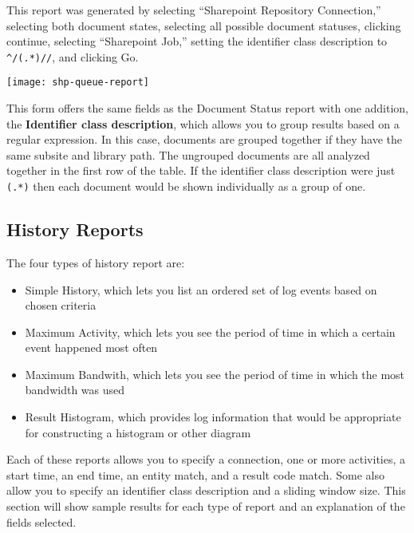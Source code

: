 \begin{changemargin}{1.5in}{0in}
This report was generated by selecting ``Sharepoint Repository
Connection,'' selecting both document states, selecting all possible
document statuses, clicking continue, selecting ``Sharepoint Job,''
setting the identifier class description to \linebreak \texttt{\^{}/(.*)//}, and
clicking Go.

\texttt{[image: shp-queue-report]}

This form offers the same fields as the Document Status report with
one addition, the \textbf{Identifier class description}, which allows
you to group results based on a regular expression. In this case,
documents are grouped together if they have the same subsite and
library path. The ungrouped documents are all analyzed together in the
first row of the table. If the identifier class description were just
\texttt{(.*)} then each document would be shown individually as a group of
one.



\subsection{History Reports}

The four types of history report are:

\begin{itemize}

\item Simple History, which lets you list an ordered set of log events
based on chosen criteria

\item Maximum Activity, which lets you see the period of time in
which a certain event happened most often

\item Maximum Bandwith, which lets you see the period of time in
which the most bandwidth was used 

\item Result Histogram, which provides log information that would be
appropriate for constructing a histogram or other diagram

\end{itemize}

Each of these reports allows you to specify a connection, one or more
activities, a start time, an end time, an entity match, and a result code
match.  Some also allow you to specify an identifier class description
and a sliding window size. This section will show sample results for
each type of report and an explanation of the fields selected.


\end{changemargin}
